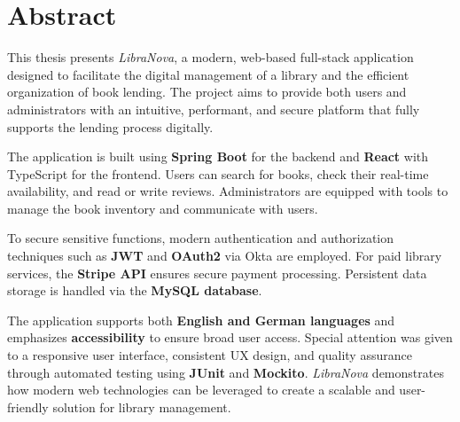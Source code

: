 \chapter*{Abstract}

\sloppy
This thesis presents \textit{LibraNova}, a modern, web-based full-stack application designed to facilitate the digital management of a library and the efficient organization of book lending. The project aims to provide both users and administrators with an intuitive, performant, and secure platform that fully supports the lending process digitally. 

\noindent The application is built using \textbf{Spring Boot} for the backend and \textbf{React} with TypeScript for the frontend. Users can search for books, check their real-time availability, and read or write reviews. Administrators are equipped with tools to manage the book inventory and communicate with users. 

\noindent To secure sensitive functions, modern authentication and authorization techniques such as \textbf{JWT} and \textbf{OAuth2} via Okta are employed. For paid library services, the \textbf{Stripe API} ensures secure payment processing. Persistent data storage is handled via the \textbf{MySQL database}. 

\noindent The application supports both \textbf{English and German languages} and emphasizes \textbf{accessibility} to ensure broad user access. Special attention was given to a responsive user interface, consistent UX design, and quality assurance through automated testing using \textbf{JUnit} and \textbf{Mockito}. \textit{LibraNova} demonstrates how modern web technologies can be leveraged to create a scalable and user-friendly solution for library management.
